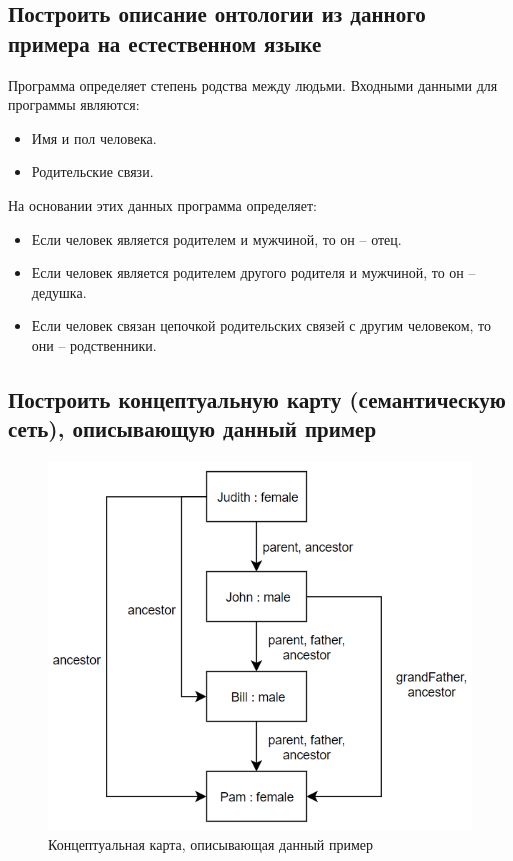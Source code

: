 \documentclass[14pt,a4paper,report]{report}
\begin{document}
\subsection{Построить описание онтологии из данного примера на естественном языке}

Программа определяет степень родства между людьми. Входными данными для программы являются:

\begin{itemize}
	\item Имя и пол человека.
	\item Родительские связи.
\end{itemize}

На основании этих данных программа определяет:

\begin{itemize}
	\item Если человек является родителем и мужчиной, то он -- отец.
	\item Если человек является родителем другого родителя и мужчиной, то он -- дедушка.
	\item Если человек связан цепочкой родительских связей с другим человеком, то они -- родственники.
\end{itemize}

\subsection{Построить концептуальную карту (семантическую сеть), описывающую данный пример}

\begin{figure}[h!]
	\centering
	\includegraphics[scale = 0.65]{images/3.png}
	\caption{Концептуальная карта, описывающая данный пример}
\end{figure}
\end{document}
